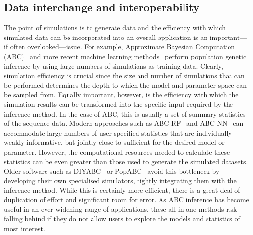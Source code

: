\documentclass{article}
\begin{document}
\subsection{Data interchange and interoperability}
The point of simulations is to generate data and the efficiency with
which simulated data can be incorporated into an overall application
is an important---if often overlooked---issue.
For example, Approximate Bayesian Computation
(ABC)~\citep{beaumont2002approximate,csillery2010approximate,wegmann2010abctoolbox}
and more recent machine learning
methods~\citep{sheehan2016deep,schrider2018supervised,flagel2019unreasonable}
perform population genetic inference by using large numbers of
simulations as training data. Clearly, simulation efficiency is
crucial since the size and number of simulations that can be performed determines
the depth to which the model and parameter space can be sampled from.
Equally important,
however, is the efficiency with which the simulation results can be
transformed into the specific input required by the inference method.
In the case of ABC, this is usually a set of summary statistics of the sequence data.
Modern approaches such as
ABC-RF~\citep{raynal2019abc,pudlo2016abc} and
ABC-NN~\citep{csillery2012abc,blum2010abc} can accommodate large numbers of user-specified statistics that are individually weakly informative,
but jointly close to sufficient for the desired model or parameter.
However, the computational resources needed to calculate these statistics can be even
greater than those used to generate the simulated datasets.
Older software such as DIYABC~\citep{cornuet2008inferring}
or PopABC~\citep{lopes2009popabc} avoid this bottleneck by
developing their own specialised simulators, tightly integrating them
with the inference method. While this is certainly more efficient,
there is a great deal of duplication of effort and significant
room for error.
As ABC inference has become useful in an ever-widening range of applications,
these all-in-one methods risk falling behind if they do not allow users to explore
the models and statistics of most interest.
\end{document}
